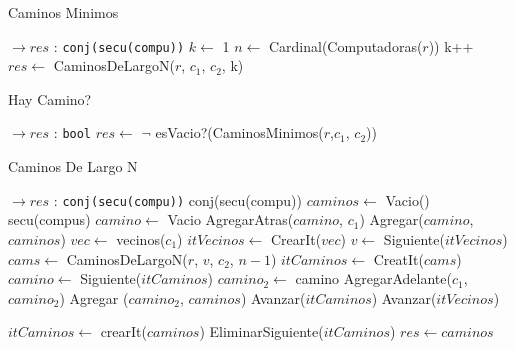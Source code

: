 \begin{Algoritmos}
\begin{algorithm}
\caption{Caminos Minimos}
\begin{algorithmic}[1]
   $\to res$ : \texttt{conj(secu(compu))}  
   \State $k \gets$ 1
   \State $n \gets$ Cardinal(Computadoras($r$))
     \State k++
   \EndWhile
   \State $res \gets$ CaminosDeLargoN($r$, $c_1$, $c_2$, k)
\EndProcedure
\end{algorithmic}
\end{algorithm}


\begin{algorithm}
\caption{Hay Camino?}
\begin{algorithmic}[1]
   $\to res$ : \texttt{bool} 
   \State $res \gets$ $\neg$ esVacio?(CaminosMinimos($r$,$c_1$, $c_2$))
\EndProcedure
\end{algorithmic}
\end{algorithm}


\begin{algorithm}
\caption{Caminos De Largo N}
\begin{algorithmic}[1]
   $\to res$ : \texttt{conj(secu(compu))} 
   \State conj(secu(compu)) $caminos \gets$ Vacio()
     \State secu(compus) $camino \gets$ Vacio
     \State AgregarAtras($camino$, $c_1$)
     \State Agregar($camino$, $caminos$)
   \Else
     \State $vec \gets$ vecinos($c_1$)
     \State $itVecinos \gets$ CrearIt($vec$)
       \State $v \gets$ Siguiente($itVecinos$)
       \State $cams \gets$ CaminosDeLargoN($r$, $v$, $c_2$, $n-1$)
       \State $itCaminos \gets$ CreatIt($cams$)
         \State $camino \gets$ Siguiente($itCaminos$)
           \State $camino_2 \gets$ camino
           \State AgregarAdelante($c_1$, $camino_2$)
           \State Agregar ($camino_2$, $caminos$)
         \EndIf
       \State Avanzar($itCaminos$)
       \EndWhile
    \State Avanzar($itVecinos$)
    \EndWhile    
   \EndIf
   
   \State $itCaminos \gets$ crearIt($caminos$)
       \State EliminarSiguiente($itCaminos$)
      \EndIf
    \EndWhile
    \State $res \gets caminos$

 \EndProcedure
\end{algorithmic}
\end{algorithm}


\end{Algoritmos}







